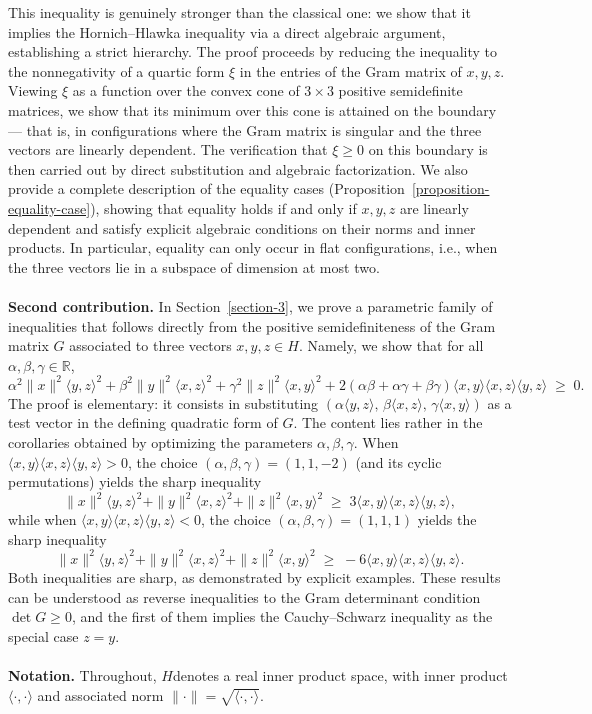 \documentclass[a4paper,10pt]{article}
\theoremstyle{plain}
\theoremstyle{definition}
\theoremstyle{remark}
\begin{document}
This inequality is genuinely stronger than the classical one: we show that it implies the Hornich–Hlawka inequality via a direct algebraic argument, establishing a strict hierarchy. The proof proceeds by reducing the inequality to the nonnegativity of a quartic form $\xi$ in the entries of the Gram matrix of $x,y,z$. Viewing $\xi$ as a function over the convex cone of $3\times 3$ positive semidefinite matrices, we show that its minimum over this cone is attained on the boundary — that is, in configurations where the Gram matrix is singular and the three vectors are linearly dependent. The verification that $\xi \geq 0$ on this boundary is then carried out by direct substitution and algebraic factorization. We also provide a complete description of the equality cases (Proposition~\ref{proposition-equality-case}), showing that equality holds if and only if $x,y,z$ are linearly dependent and satisfy explicit algebraic conditions on their norms and inner products. In particular, equality can only occur in flat configurations, i.e., when the three vectors lie in a subspace of dimension at most two. \\ \\
\textbf{Second contribution.} In Section~\ref{section-3}, we prove a parametric family of inequalities that follows directly from the positive semidefiniteness of the Gram matrix $G$ associated to three vectors $x,y,z \in H$. Namely, we show that for all $\alpha, \beta, \gamma \in \mathbb{R}$,
\[\alpha^2\|x\|^2\langle y,z\rangle^2 + \beta^2\|y\|^2\langle x,z\rangle^2 + \gamma^2\|z\|^2\langle x,y\rangle^2 + 2(\alpha\beta + \alpha\gamma + \beta\gamma)\langle x,y\rangle\langle x,z\rangle\langle y,z\rangle \;\geq\; 0.\]
The proof is elementary: it consists in substituting $(\alpha\langle y,z\rangle,\, \beta\langle x,z\rangle,\, \gamma\langle x,y\rangle)$ as a test vector in the defining quadratic form of $G$. The content lies rather in the corollaries obtained by optimizing the parameters $\alpha, \beta, \gamma$. When $\langle x,y\rangle\langle x,z\rangle\langle y,z\rangle > 0$, the choice $(\alpha,\beta,\gamma) = (1,1,-2)$ (and its cyclic permutations) yields the sharp inequality 
\[ \|x\|^2\langle y,z\rangle^2 + \|y\|^2\langle x,z\rangle^2 + \|z\|^2\langle x,y\rangle^2 \;\geq\; 3\langle x,y\rangle\langle x,z\rangle\langle y,z\rangle, \] 
while when $\langle x,y\rangle\langle x,z\rangle\langle y,z\rangle < 0$, the choice $(\alpha,\beta,\gamma) = (1,1,1)$ yields the sharp inequality
\[\|x\|^2\langle y,z\rangle^2 + \|y\|^2\langle x,z\rangle^2 + \|z\|^2\langle x,y\rangle^2 \;\geq\; -6\langle x,y\rangle\langle x,z\rangle\langle y,z\rangle.\]
Both inequalities are sharp, as demonstrated by explicit examples. These results can be understood as reverse inequalities to the Gram determinant condition $\det G \geq 0$, and the first of them implies the Cauchy–Schwarz inequality as the special case $z = y$. \\
\mbox{} \\
\textbf{Notation.} Throughout, $H$denotes a real inner product space, with inner product $\langle \cdot, \cdot \rangle$ and associated norm $\|\cdot\| = \sqrt{\langle \cdot, \cdot \rangle}$.
\end{document}
